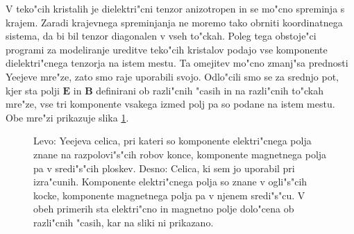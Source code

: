 \documentclass[a4paper,10pt]{article}
\renewcommand{\vec}{\mathbf}
\newcommand{\E}{\vec E}
\newcommand{\B}{\vec B}
\begin{document}
V teko"cih kristalih je dielektri"cni tenzor anizotropen in se mo"cno spreminja s krajem. 
Zaradi krajevnega spreminjanja ne moremo tako obrniti koordinatnega sistema, da bi bil tenzor diagonalen v vseh to"ckah. 
Poleg tega obstoje"ci programi za modeliranje ureditve teko"cih kristalov podajo vse komponente dielektri"cnega tenzorja na istem mestu\cite{ravnik-zumer-ldg}.
Ta omejitev mo"cno zmanj"sa prednosti Yeejeve mre"ze, zato smo raje uporabili svojo. 
Odlo"cili smo se za srednjo pot, kjer sta polji $\E$ in $\B$ definirani ob razli"cnih "casih in na razli"cnih to"ckah mre"ze, vse tri komponente vsakega izmed polj pa so podane na istem mestu. 
Obe mre"zi prikazuje slika \ref{fig:lattice}. 

\begin{figure}[h]
\centering
\caption{Levo: Yeejeva celica, pri kateri so komponente elektri"cnega polja znane na razpolovi"s"cih robov konce, komponente magnetnega polja pa v sredi"s"cih ploskev\cite{yee-lattice}. Desno: Celica, ki sem jo uporabil pri izra"cunih. Komponente elektri"cnega polja so znane v ogli"s"cih kocke, komponente magnetnega polja pa v njenem sredi"s"cu. V obeh primerih sta elektri"cno in magnetno polje dolo"cena ob razli"cnih "casih, kar na sliki ni prikazano.}
\label{fig:lattice}
\end{figure}
\end{document}
